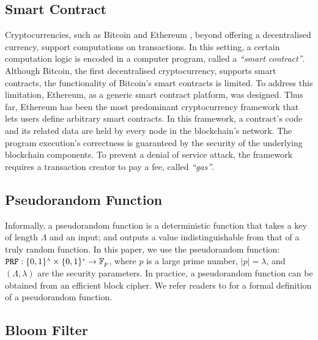 \vspace{-2.1mm}

\subsection{Smart Contract}\label{subsec:SC} Cryptocurrencies, such as Bitcoin \cite{bitcoin} and Ethereum \cite{ethereum}, beyond offering a decentralised currency,  support  computations on  transactions. In this setting,  a certain computation logic is encoded in a computer program, called a \emph{``smart contract''}. Although Bitcoin, the first decentralised cryptocurrency, supports smart contracts, the functionality of Bitcoin's smart contracts is  limited. To address this limitation, Ethereum, as a generic smart contract platform, was designed. Thus far, Ethereum has been the most predominant cryptocurrency framework that lets users define arbitrary smart contracts. In this framework, a contract's code and its related data  are held by every node in the blockchain's network. The program execution's  correctness  is  guaranteed by the security of the underlying blockchain components. To prevent  a denial of service attack, the framework requires a transaction creator to pay a  fee, called \emph{``gas''}. %




\vspace{-2mm}
\subsection{Pseudorandom Function}


Informally, a pseudorandom function is a deterministic function that takes a key of length $\Lambda$ and an input; and outputs a value  indistinguishable from that of  a truly random function.  In this paper, we use the pseudorandom function:   $\mathtt {PRF}: \{0,1\}^{\scriptscriptstyle \Lambda}\times \{0,1\}^{\scriptscriptstyle *} \rightarrow  \mathbb{F}_p$, where $p$ is a large prime number, $|p|=\lambda$, and $(\Lambda,\lambda)$ are the security parameters. In practice, a pseudorandom function can be obtained from an efficient block cipher. We refer readers to \cite{DBLP:books/crc/KatzLindell2014} for a formal definition of a pseudorandom function.

\vspace{-3mm}
\subsection{Bloom Filter}


